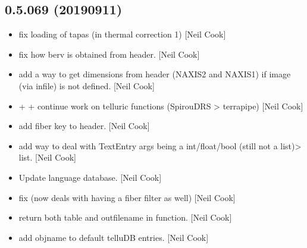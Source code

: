\documentclass[a4paper,10pt,english]{report}
\begin{document}
\subsection{0.5.069 (2019\sphinxhyphen{}09\sphinxhyphen{}11)}
\label{\detokenize{misc/changelog:id92}}\begin{itemize}
\item {} 
 \sphinxhyphen{} fix loading of tapas (in thermal
correction 1) {[}Neil Cook{]}

\item {} 
 \sphinxhyphen{} fix how berv is obtained from header. {[}Neil
Cook{]}

\item {} 
 \sphinxhyphen{} add a way to get dimensions from header
(NAXIS2 and NAXIS1) if image (via infile) is not defined. {[}Neil Cook{]}

\item {} 
 +  +
 \sphinxhyphen{} continue work on telluric functions
(SpirouDRS \textendash{}\textgreater{} terrapipe) {[}Neil Cook{]}

\item {} 
 \sphinxhyphen{} add fiber key to header. {[}Neil
Cook{]}

\item {} 
 \sphinxhyphen{} add way to deal with TextEntry args being a
int/float/bool (still not a list)\textendash{}\textgreater{} list. {[}Neil Cook{]}

\item {} 
Update language database. {[}Neil Cook{]}

\item {} 
 \sphinxhyphen{} fix  (now deals with having a fiber filter
as well) {[}Neil Cook{]}

\item {} 
 \sphinxhyphen{} return both table and outfilename in 
function. {[}Neil Cook{]}

\item {} 
 \sphinxhyphen{} add objname to
default telluDB entries. {[}Neil Cook{]}


\end{itemize}
\end{document}
